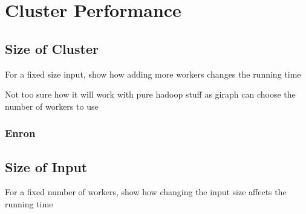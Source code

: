 \section{Cluster Performance}

\subsection{Size of Cluster}
For a fixed size input, show how adding more workers changes the running time

Not too sure how it will work with pure hadoop stuff as giraph can choose the number of workers to use

\subsubsection{Enron}


\subsection{Size of Input}
For a fixed number of workers, show how changing the input size affects the running time